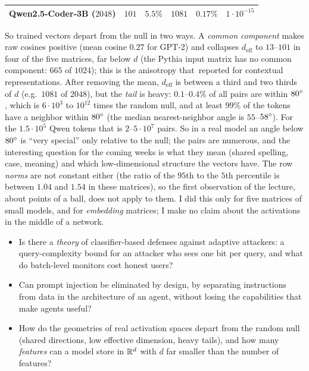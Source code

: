 \begin{beyond}
\begin{center}
\begin{tabular}{@{}lrrrrr@{}}
Qwen2.5-Coder-3B ($2048$) & $101$ & $5.5\%$ & $1081$ & $0.17\%$ & $1\cdot10^{-15}$\\
\bottomrule
\end{tabular}
\end{center}
So trained vectors depart from the null in two ways. A \emph{common component} makes raw cosines positive (mean cosine $0.27$ for GPT-2) and collapses $d_{\mathrm{eff}}$ to $13$--$101$ in four of the five matrices, far below $d$ (the Pythia input matrix has no common component: $665$ of $1024$); this is the anisotropy that\,\citet{ethayarajh2019} reported for contextual representations. After removing the mean, $d_{\mathrm{eff}}$ is between a third and two thirds of $d$ (e.g.\ $1081$ of $2048$), but the \emph{tail} is heavy: $0.1$--$0.4\%$ of all pairs are within $80^{\circ}$, which is $6\cdot10^{3}$ to $10^{12}$ times the random null, and at least $99\%$ of the tokens have a neighbor within $80^{\circ}$ (the median nearest-neighbor angle is $55$--$58^{\circ}$). For the $1.5\cdot10^{5}$ Qwen tokens that is $2$--$5\cdot10^{7}$ pairs. So in a real model an angle below $80^{\circ}$ is ``very special'' only relative to the null; the pairs are numerous, and the interesting question for the coming weeks is what they mean (shared spelling, case, meaning) and which low-dimensional structure the vectors have. The row \emph{norms} are not constant either (the ratio of the $95$th to the $5$th percentile is between $1.04$ and $1.54$ in these matrices), so the first observation of the lecture, about points of a ball, does not apply to them. I did this only for five matrices of small models, and for \emph{embedding} matrices; I make no claim about the activations in the middle of a network.
\end{beyond}

\begin{openq}
\begin{itemize}
  \item Is there a \emph{theory} of classifier-based defenses against adaptive attackers: a query-complexity bound for an attacker who sees one bit per query, and what do batch-level monitors cost honest users?
  \item Can prompt injection be eliminated by design, by separating instructions from data in the architecture of an agent, without losing the capabilities that make agents useful?
  \item How do the geometries of real activation spaces depart from the random null (shared directions, low effective dimension, heavy tails), and how many \emph{features} can a model store in $\mathbb{R}^{d}$ with $d$ far smaller than the number of features?
\end{itemize}
\end{openq}

